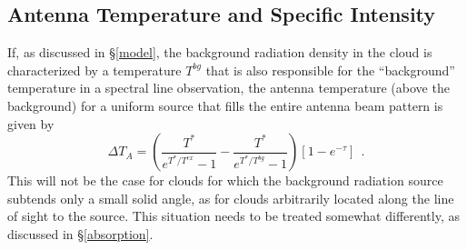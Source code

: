 \documentclass[12pt]{aastex}
\def \lp{\>\> .}
\def \C2{C{\sc II}}
\def \mic{$\mu$m}
\def \be{\begin{equation}}
\def \ee{   \end{equation}}
\def \lp{\>\> .}
\begin{document}


\subsection{Antenna Temperature and Specific Intensity}


If, as discussed in \S \ref{model}, the background radiation density in the cloud is characterized by a temperature $T^{bg}$ that is also responsible for the ``background'' temperature in a spectral line observation, the antenna temperature (above the background) for a uniform source that fills the entire antenna beam pattern is given by
\be
\Delta T_A = (\frac{T^*}{e^{T^*/T^{ex}} - 1} - \frac{T^*}{e^{T^*/T^{bg}} -1})[1 - e^{-\tau}] \lp
\label{ta_gen}
\ee
This will not be the case for clouds for which the background radiation source subtends only a small solid angle, as for clouds arbitrarily located along the line of sight to the source.  This situation needs to be treated somewhat differently, as discussed in \S \ref{absorption}.
\end{document}
